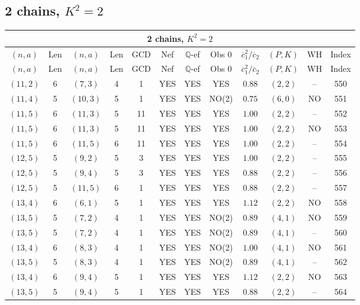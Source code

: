 \subsection{2 chains, $K^2 = 2$}
\begin{longtable}{|c|c|c|c|c|c|c|c|c|c|c|c|}
\hline
\multicolumn{12}{|c|}{2 chains, $K^2 = 2$}\\
\hline
$(n,a)$ & Len & $(n,a)$ & Len & GCD & Nef & $\mathbb Q$-ef & Obs 0 & $\overline c_1^2 / \overline c_2$ & $(P,K)$ & WH & Index\\
\hline
\endfirsthead

\hline
$(n,a)$ & Len & $(n,a)$ & Len & GCD & Nef & $\mathbb Q$-ef & Obs 0 & $\overline c_1^2 / \overline c_2$ & $(P,K)$ & WH & Index\\
\hline
\endhead
\hline
\endfoot

$(11,2)$ & 6 & $(7,3)$ & 4 & 1 & YES & YES & YES & $0.88$ & $(2,2)$ & -- & 550\\
$(11,4)$ & 5 & $(10,3)$ & 5 & 1 & YES & YES & NO(2) & $0.75$ & $(6,0)$ & NO & 551\\
$(11,5)$ & 6 & $(11,3)$ & 5 & 11 & YES & YES & YES & $1.00$ & $(2,2)$ & -- & 552\\
$(11,5)$ & 6 & $(11,3)$ & 5 & 11 & YES & YES & YES & $1.00$ & $(2,2)$ & NO & 553\\
$(11,5)$ & 6 & $(11,5)$ & 6 & 11 & YES & YES & YES & $1.00$ & $(2,2)$ & -- & 554\\
$(12,5)$ & 5 & $(9,2)$ & 5 & 3 & YES & YES & YES & $1.00$ & $(2,2)$ & -- & 555\\
$(12,5)$ & 5 & $(9,4)$ & 5 & 3 & YES & YES & YES & $0.88$ & $(2,2)$ & -- & 556\\
$(12,5)$ & 5 & $(11,5)$ & 6 & 1 & YES & YES & YES & $0.88$ & $(2,2)$ & -- & 557\\
$(13,4)$ & 6 & $(6,1)$ & 5 & 1 & YES & YES & YES & $1.12$ & $(2,2)$ & NO & 558\\
$(13,5)$ & 5 & $(7,2)$ & 4 & 1 & YES & YES & NO(2) & $0.89$ & $(4,1)$ & NO & 559\\
$(13,5)$ & 5 & $(7,2)$ & 4 & 1 & YES & YES & NO(2) & $0.89$ & $(4,1)$ & -- & 560\\
$(13,4)$ & 6 & $(8,3)$ & 4 & 1 & YES & YES & NO(2) & $1.00$ & $(4,1)$ & NO & 561\\
$(13,5)$ & 5 & $(8,3)$ & 4 & 1 & YES & YES & NO(2) & $0.89$ & $(4,1)$ & -- & 562\\
$(13,4)$ & 6 & $(9,4)$ & 5 & 1 & YES & YES & YES & $1.12$ & $(2,2)$ & NO & 563\\
$(13,5)$ & 5 & $(9,4)$ & 5 & 1 & YES & YES & YES & $0.88$ & $(2,2)$ & -- & 564\\

\end{longtable}
